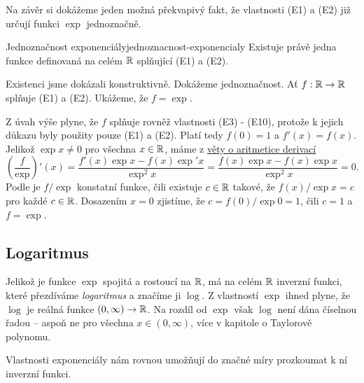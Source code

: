 Na závěr si dokážeme jeden možná překvapivý fakt, že vlastnosti (E1) a (E2) již
určují funkci $\exp$ jednoznačně.

\begin{theorem}{Jednoznačnost exponenciály}{jednoznacnost-exponencialy}
 Existuje právě jedna funkce definovaná na celém $\mathbb{R}$ splňující (E1) a (E2).
\end{theorem}
\begin{thmproof}
 Existenci jsme dokázali konstruktivně. Dokážeme jednoznačnost. Ať $f:\mathbb{R} \to \mathbb{R}$
 splňuje (E1) a (E2). Ukážeme, že $f = \exp$.

 Z úvah výše plyne, že $f$ splňuje rovněž vlastnosti (E3) - (E10), protože k
 jejich důkazu byly použity pouze (E1) a (E2). Platí tedy $f(0) = 1$ a $f'(x) =
 f(x)$. Jelikož $\exp x \neq 0$ pro všechna $x \in \mathbb{R}$, máme z
 \hyperref[thm:aritmetika-derivaci]{věty o aritmetice derivací}
 \[
  \left( \frac{f}{\exp} \right)'(x) = \frac{f'(x) \exp x - f(x) \exp'x}{\exp^2
  x} = \frac{f(x) \exp x - f(x) \exp x}{\exp^2 x} = 0.
 \]
 Podle  je $f / \exp$ konstatní
 funkce, čili existuje $c \in \mathbb{R}$ takové, že $f(x) / \exp x = c$ pro každé
 $c \in \mathbb{R}$. Dosazením $x = 0$ zjistíme, že $c = f(0) / \exp 0 = 1$, čili $c =
 1$ a $f = \exp$.
\end{thmproof}

\subsection{Logaritmus}
\label{ssec:logaritmus}

Jelikož je funkce $\exp$ spojitá a rostoucí na $\mathbb{R}$, má na celém $\mathbb{R}$ inverzní
funkci, které přezdíváme \emph{logaritmus} a značíme ji $\log$. Z vlastností
$\exp$ ihned plyne, že $\log$ je reálná funkce $(0,\infty) \to \mathbb{R}$. Na rozdíl od
$\exp$ však $\log$ není dána číselnou řadou -- aspoň ne pro všechna $x \in
(0,\infty)$, více v kapitole o Taylorově polynomu.

Vlastnosti exponenciály nám rovnou umožňují do značné míry prozkoumat k ní
inverzní funkci.

